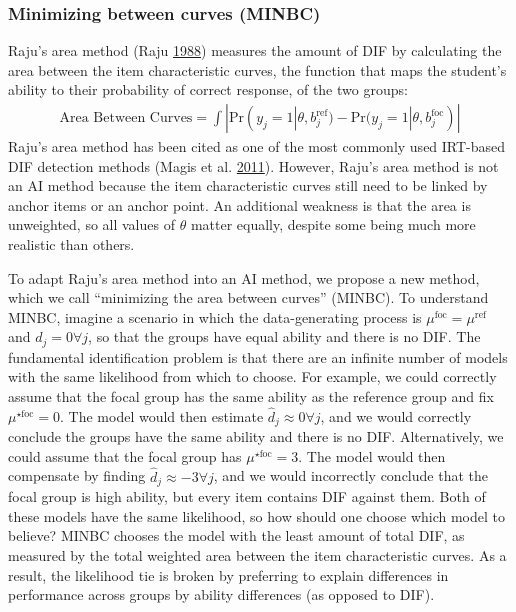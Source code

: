 \documentclass[
  11pt,
]{article}
\begin{document}
\hypertarget{minimizing-between-curves-minbc}{%
\subsubsection{Minimizing between curves (MINBC)}\label{minimizing-between-curves-minbc}}

Raju's area method (Raju \protect\hyperlink{ref-raju1988area}{1988}) measures the amount of DIF by calculating the area between the item characteristic curves, the function that maps the student's ability to their probability of correct response, of the two groups:
\begin{align}
\text{Area Between Curves} = \int |\text{Pr}(y_j = 1| \theta, b_j^{\text{ref}}) - \text{Pr}(y_j = 1| \theta, b_j^{\text{foc}})|
\end{align}
Raju's area method has been cited as one of the most commonly used IRT-based DIF detection methods (Magis et al. \protect\hyperlink{ref-magis2011generalized}{2011}). However, Raju's area method is not an AI method because the item characteristic curves still need to be linked by anchor items or an anchor point. An additional weakness is that the area is unweighted, so all values of \(\theta\) matter equally, despite some being much more realistic than others.

To adapt Raju's area method into an AI method, we propose a new method, which we call \enquote{minimizing the area between curves} (MINBC). To understand MINBC, imagine a scenario in which the data-generating process is \(\mu^{\text{foc}} = \mu^{\text{ref}}\) and \(d_j = 0 \forall j\), so that the groups have equal ability and there is no DIF. The fundamental identification problem is that there are an infinite number of models with the same likelihood from which to choose. For example, we could correctly assume that the focal group has the same ability as the reference group and fix \(\mu^{\star\text{foc}} = 0\). The model would then estimate \(\hat d_j \approx 0 \forall j\), and we would correctly conclude the groups have the same ability and there is no DIF. Alternatively, we could assume that the focal group has \(\mu^{\star\text{foc}} = 3\). The model would then compensate by finding \(\hat d_j \approx -3 \forall j\), and we would incorrectly conclude that the focal group is high ability, but every item contains DIF against them. Both of these models have the same likelihood, so how should one choose which model to believe? MINBC chooses the model with the least amount of total DIF, as measured by the total weighted area between the item characteristic curves. As a result, the likelihood tie is broken by preferring to explain differences in performance across groups by ability differences (as opposed to DIF).
\end{document}
